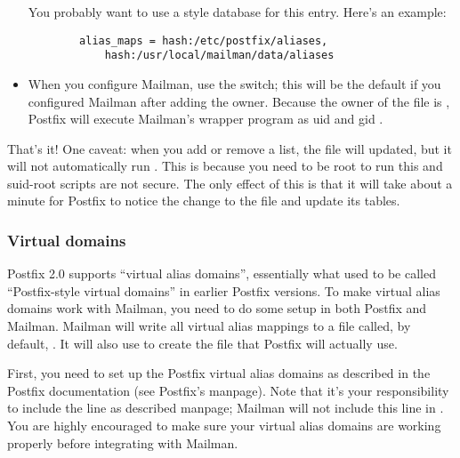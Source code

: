 \documentclass{howto}
\begin{document}
\begin{itemize}
      You probably want to use a  style database for this entry.
      Here's an example:

      \begin{verbatim}
        alias_maps = hash:/etc/postfix/aliases,
            hash:/usr/local/mailman/data/aliases
      \end{verbatim}

\item When you configure Mailman, use the
       switch; this will be the default
      if you configured Mailman after adding the  owner.
      Because the owner of the  file is ,
      Postfix will execute Mailman's wrapper program as uid and gid
      .

\end{itemize}

That's it!  One caveat: when you add or remove a list, the 
file will updated, but it will not automatically run .
This is because you need to be root to run this and suid-root scripts are not
secure.  The only effect of this is that it will take about a minute for
Postfix to notice the change to the  file and update its
tables.

\subsubsection{Virtual domains\label{postfix-virtual}}

Postfix 2.0 supports ``virtual alias domains'', essentially what used to be
called ``Postfix-style virtual domains'' in earlier Postfix versions.  To make
virtual alias domains work with Mailman, you need to do some setup in both
Postfix and Mailman.  Mailman will write all virtual alias mappings to a file
called, by default, .  It will
also use  to create the  file
that Postfix will actually use.

First, you need to set up the Postfix virtual alias domains as described in
the Postfix documentation (see Postfix's  manpage).  Note
that it's your responsibility to include the  line as described manpage; Mailman will not include this line in
.  You are highly encouraged to make sure your virtual
alias domains are working properly before integrating with Mailman.
\end{document}
